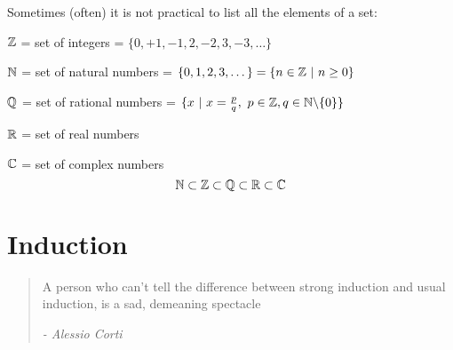Sometimes (often) it is not practical to list all the elements of a set: 
\begin{examples}	\shortskip
\item $\mathbb{Z}$ = set of integers = $\{0, +1,-1,2,-2,3,-3,\dots\}$	
\item $\mathbb{N}$ = set of natural numbers = $\{0, 1, 2, 3,\dots\} = \{n \in \mathbb{Z} ~|~ n \geq 0\}$	
\item $\mathbb{Q}$ = set of rational numbers = $\{x ~|~ x = \frac{p}{q},~ p \in \mathbb{Z}, q \in \mathbb{N}\backslash\{0\} \}$	
\item $\mathbb{R}$ = set of real numbers 	
\item $\mathbb{C}$ = set of complex numbers
 \[\mathbb{N} \subset \mathbb{Z} \subset \mathbb{Q} \subset \mathbb{R} \subset \mathbb{C}\]

\end{examples}



\pagebreak
\section{Induction}

\begin{quote}
A person who can't tell the difference between strong induction and usual induction, is a sad, demeaning spectacle
\begin{flushright}
      \textit{ -  Alessio Corti}
       \end{flushright} 
\end{quote} 





